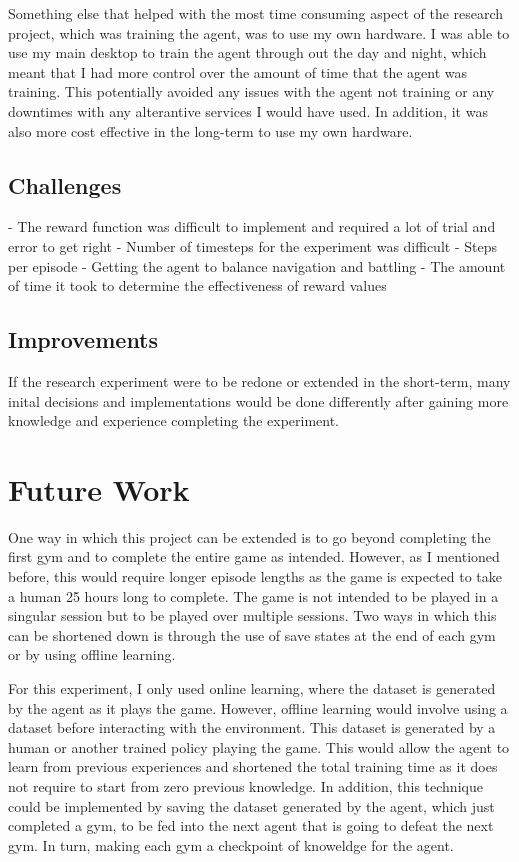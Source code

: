 Something else that helped with the most time consuming aspect of the research project, which was training the agent, was to use my own hardware. I was able to use my main desktop to train the agent through out the day and night, which meant that I had more control over the amount of time that the agent was training. This potentially avoided any issues with the agent not training or any downtimes with any alterantive services I would have used. In addition, it was also more cost effective in the long-term to use my own hardware.

\subsection{Challenges}

- The reward function was difficult to implement and required a lot of trial and error to get right
- Number of timesteps for the experiment was difficult 
- Steps per episode 
- Getting the agent to balance navigation and battling 
- The amount of time it took to determine the effectiveness of reward values

\subsection{Improvements}

If the research experiment were to be redone or extended in the short-term, many inital decisions and implementations would be done differently after gaining more knowledge and experience completing the experiment. 

\section{Future Work}

One way in which this project can be extended is to go beyond completing the first gym and to complete the entire game as intended. However, as I mentioned before, this would require longer episode lengths as the game is expected to take a human 25 hours long to complete. The game is not intended to be played in a singular session but to be played over multiple sessions. Two ways in which this can be shortened down is through the use of save states at the end of each gym or by using offline learning. 

For this experiment, I only used online learning, where the dataset is generated by the agent as it plays the game. However, offline learning would involve using a dataset before interacting with the environment. This dataset is generated by a human or another trained policy playing the game. This would allow the agent to learn from previous experiences and shortened the total training time as it does not require to start from zero previous knowledge. In addition, this technique could be implemented by saving the dataset generated by the agent, which just completed a gym, to be fed into the next agent that is going to defeat the next gym. In turn, making each gym a checkpoint of knoweldge for the agent. 


